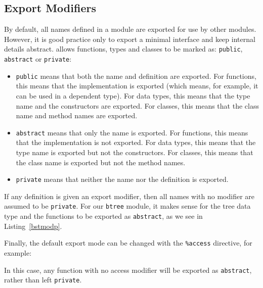 \subsection{Export Modifiers}

By default, all names defined in a module are exported for use by other modules.
However, it is good practice only to export a minimal interface and keep internal details abstract.
\Idris{} allows functions, types and classes to be marked as: \texttt{public}, \texttt{abstract} or \texttt{private}:

\begin{itemize}
\item \texttt{public} means that both the name and definition are exported.
For functions, this means that the implementation is exported (which means, for example, it can be used in a dependent type).
For data types, this means that the type name and the constructors are exported.
For classes, this means that the class name and method names are exported.

\item
\texttt{abstract} means that only the name is exported.
For functions, this means that the implementation is not exported.
For data types, this means that the type name is exported but not the constructors.
For classes, this means that the class name is exported but not the method names.

\item
\texttt{private} means that neither the name nor the definition is exported.
\end{itemize}

\noindent
If any definition is given an export modifier, then all names with no modifier are assumed to be \texttt{private}.
For our \texttt{btree} module, it makes sense for the tree data type and the functions to be exported as \texttt{abstract}, as we see in Listing~\ref{bstmodp}.


\noindent
Finally, the default export mode can be changed with the \texttt{\%access} directive, for example:

\begin{code}
\end{code}

\noindent
In this case, any function with no access modifier will be exported as \texttt{abstract}, rather than left \texttt{private}.

